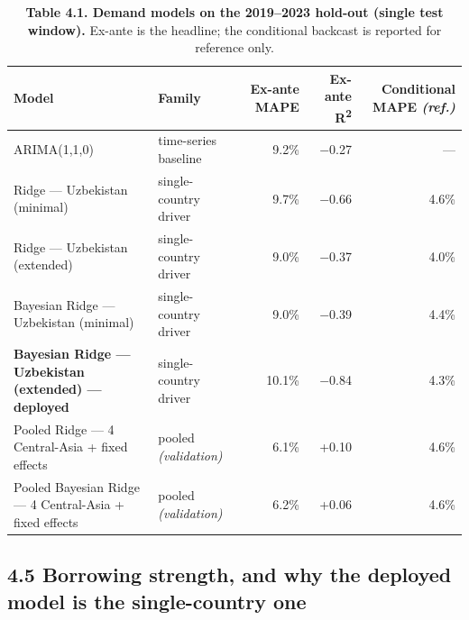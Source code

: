 \documentclass[10pt,twocolumn]{article}
\begin{document}
\begin{table}[tp]
\centering
\caption*{\textbf{Table 4.1. Demand models on the 2019--2023 hold-out (single test window).} Ex-ante is the headline; the conditional backcast is reported for reference only.}
\renewcommand{\arraystretch}{1.18}\small
\begin{tabularx}{\textwidth}{LLrrr}
\toprule
\textbf{Model} & \textbf{Family} & \textbf{Ex-ante MAPE} & \textbf{Ex-ante R\textsuperscript{2}} & \textbf{Conditional MAPE \textit{(ref.)}} \\
\midrule
ARIMA(1,1,0) & time-series baseline & 9.2\% & $-$0.27 & --- \\
Ridge --- Uzbekistan (minimal) & single-country driver & 9.7\% & $-$0.66 & 4.6\% \\
Ridge --- Uzbekistan (extended) & single-country driver & 9.0\% & $-$0.37 & 4.0\% \\
Bayesian Ridge --- Uzbekistan (minimal) & single-country driver & 9.0\% & $-$0.39 & 4.4\% \\
\textbf{Bayesian Ridge --- Uzbekistan (extended) --- deployed} & single-country driver & 10.1\% & $-$0.84 & 4.3\% \\
Pooled Ridge --- 4 Central-Asia + fixed effects & pooled \textit{(validation)} & 6.1\% & +0.10 & 4.6\% \\
Pooled Bayesian Ridge --- 4 Central-Asia + fixed effects & pooled \textit{(validation)} & 6.2\% & +0.06 & 4.6\% \\
\bottomrule
\end{tabularx}
\par{}
\end{table}

\subsection*{4.5 Borrowing strength, and why the deployed model is the single-country one}
\end{document}
